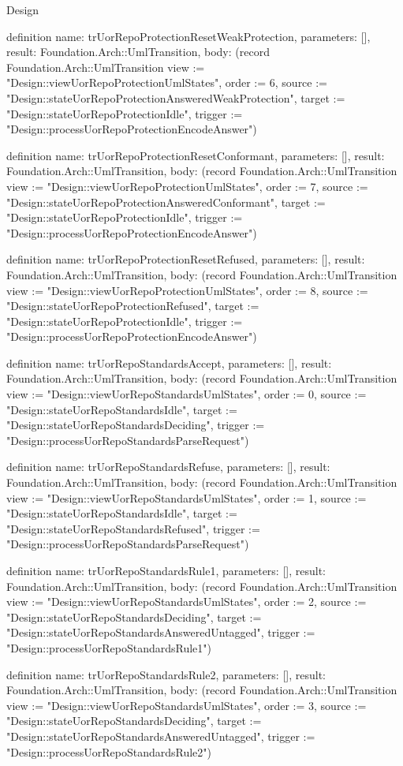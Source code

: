 \begin{lexlean}{Design}
\begin{semanticmodule}
definition{
  name: trUorRepoProtectionResetWeakProtection,
  parameters: [],
  result: Foundation.Arch::UmlTransition,
  body: (record Foundation.Arch::UmlTransition {view := "Design::viewUorRepoProtectionUmlStates", order := 6, source := "Design::stateUorRepoProtectionAnsweredWeakProtection", target := "Design::stateUorRepoProtectionIdle", trigger := "Design::processUorRepoProtectionEncodeAnswer"})
}

definition{
  name: trUorRepoProtectionResetConformant,
  parameters: [],
  result: Foundation.Arch::UmlTransition,
  body: (record Foundation.Arch::UmlTransition {view := "Design::viewUorRepoProtectionUmlStates", order := 7, source := "Design::stateUorRepoProtectionAnsweredConformant", target := "Design::stateUorRepoProtectionIdle", trigger := "Design::processUorRepoProtectionEncodeAnswer"})
}

definition{
  name: trUorRepoProtectionResetRefused,
  parameters: [],
  result: Foundation.Arch::UmlTransition,
  body: (record Foundation.Arch::UmlTransition {view := "Design::viewUorRepoProtectionUmlStates", order := 8, source := "Design::stateUorRepoProtectionRefused", target := "Design::stateUorRepoProtectionIdle", trigger := "Design::processUorRepoProtectionEncodeAnswer"})
}

definition{
  name: trUorRepoStandardsAccept,
  parameters: [],
  result: Foundation.Arch::UmlTransition,
  body: (record Foundation.Arch::UmlTransition {view := "Design::viewUorRepoStandardsUmlStates", order := 0, source := "Design::stateUorRepoStandardsIdle", target := "Design::stateUorRepoStandardsDeciding", trigger := "Design::processUorRepoStandardsParseRequest"})
}

definition{
  name: trUorRepoStandardsRefuse,
  parameters: [],
  result: Foundation.Arch::UmlTransition,
  body: (record Foundation.Arch::UmlTransition {view := "Design::viewUorRepoStandardsUmlStates", order := 1, source := "Design::stateUorRepoStandardsIdle", target := "Design::stateUorRepoStandardsRefused", trigger := "Design::processUorRepoStandardsParseRequest"})
}

definition{
  name: trUorRepoStandardsRule1,
  parameters: [],
  result: Foundation.Arch::UmlTransition,
  body: (record Foundation.Arch::UmlTransition {view := "Design::viewUorRepoStandardsUmlStates", order := 2, source := "Design::stateUorRepoStandardsDeciding", target := "Design::stateUorRepoStandardsAnsweredUntagged", trigger := "Design::processUorRepoStandardsRule1"})
}

definition{
  name: trUorRepoStandardsRule2,
  parameters: [],
  result: Foundation.Arch::UmlTransition,
  body: (record Foundation.Arch::UmlTransition {view := "Design::viewUorRepoStandardsUmlStates", order := 3, source := "Design::stateUorRepoStandardsDeciding", target := "Design::stateUorRepoStandardsAnsweredUntagged", trigger := "Design::processUorRepoStandardsRule2"})
}


\end{semanticmodule}
\end{lexlean}
